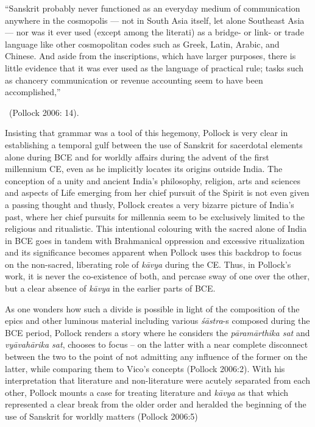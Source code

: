 \begin{myquote}
“Sanskrit probably never functioned as an everyday medium of communication anywhere in the cosmopolis — not in South Asia itself, let alone Southeast Asia — nor was it ever used (except among the literati) as a bridge- or link- or trade language like other cosmopolitan codes such as Greek, Latin, Arabic, and Chinese. And aside from the inscriptions, which have larger purposes, there is little evidence that it was ever used as the language of practical rule; tasks such as chancery communication or revenue accounting seem to have been accomplished,” 

~\hfill (Pollock 2006: 14).
\end{myquote}

Insisting that grammar was a tool of this hegemony, Pollock is very clear in establishing a temporal gulf between the use of Sanskrit for sacerdotal elements alone during BCE and for worldly affairs during the advent of the first millennium CE, even as he implicitly locates its origins outside India. The conception of a unity and ancient India’s philosophy, religion, arts and sciences and aspects of Life emerging from her chief pursuit of the Spirit is not even given a passing thought and thusly, Pollock creates a very bizarre picture of India’s past, where her chief pursuits for millennia seem to be exclusively limited to the religious and ritualistic. This intentional colouring with the sacred alone of India in BCE goes in tandem with Brahmanical oppression and excessive ritualization and its significance becomes apparent when Pollock uses this backdrop to focus on the non-sacred, liberating role of \textit{kāvya} during the CE. Thus, in Pollock’s work, it is never the co-existence of both, and percase sway of one over the other, but a clear absence of \textit{kāvya} in the earlier parts of BCE.

As one wonders how such a divide is possible in light of the composition of the epics and other luminous material including various \textit{śāstra}-s composed during the BCE period, Pollock renders a story where he considers the \textit{pāramārthika sat} and \textit{vyāvahārika sat}, chooses to focus – on the latter with a near complete disconnect between the two to the point of not admitting any influence of the former on the latter, while comparing them to Vico’s concepts (Pollock 2006:2). With his interpretation that literature and non-literature were acutely separated from each other, Pollock mounts a case for treating literature and \textit{kāvya} as that which represented a clear break from the older order and heralded the beginning of the use of Sanskrit for worldly matters (Pollock 2006:5)

